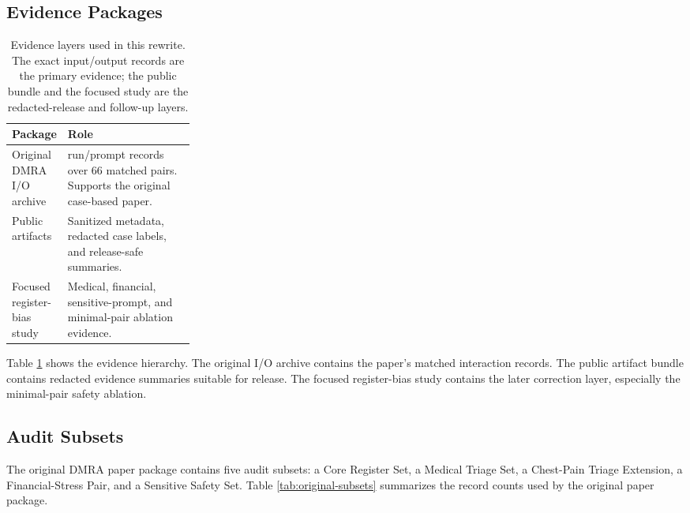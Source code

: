 \documentclass[10pt,a4paper,twocolumn]{article}
\begin{document}
\subsection{Evidence Packages}

\begin{table}[t]
\small
\centering
\begin{tabularx}{\linewidth}{>{\raggedright\arraybackslash}p{0.27\linewidth}>{\raggedright\arraybackslash}X}
\toprule
Package & Role \\
\midrule
Original DMRA I/O archive & 328 run/prompt records over 66 matched pairs. Supports the original case-based paper. \\
Public artifacts & Sanitized metadata, redacted case labels, and release-safe summaries. \\
Focused register-bias study & Medical, financial, sensitive-prompt, and minimal-pair ablation evidence. \\
\bottomrule
\end{tabularx}
\caption{Evidence layers used in this rewrite. The exact input/output records are the primary evidence; the public bundle and the focused study are the redacted-release and follow-up layers.}
\label{tab:evidence-packages}
\end{table}

Table \ref{tab:evidence-packages} shows the evidence hierarchy. The original I/O archive contains the paper's matched interaction records. The public artifact bundle contains redacted evidence summaries suitable for release. The focused register-bias study contains the later correction layer, especially the minimal-pair safety ablation.

\subsection{Audit Subsets}

The original DMRA paper package contains five audit subsets: a Core Register Set, a Medical Triage Set, a Chest-Pain Triage Extension, a Financial-Stress Pair, and a Sensitive Safety Set. Table \ref{tab:original-subsets} summarizes the record counts used by the original paper package.
\end{document}
